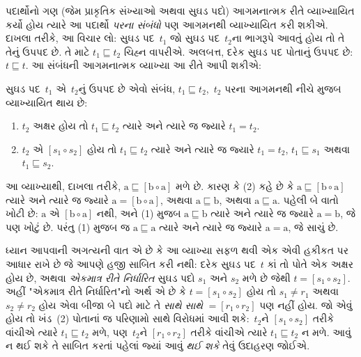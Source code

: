 \documentclass[../../../include/open-logic-section]{subfiles}
\begin{document}


પદાર્થોનો ગણ (જેમ પ્રાકૃતિક સંખ્યાઓ અથવા સુઘડ પદો)
આગમનાત્મક રીતે વ્યાખ્યાયિત કર્યો હોય ત્યારે આ પદાર્થો
\emph{પરના સંબંધો} પણ આગમનથી વ્યાખ્યાયિત કરી શકીએ.
દાખલા તરીકે, આ વિચાર લો: સુઘડ પદ~$t_1$ જો સુઘડ
પદ~$t_2$ના ભાગરૂપે આવતું હોય તો તે તેનું ઉપપદ છે.
તે માટે $t_1 \sqsubseteq t_2$ ચિહ્ન વાપરીએ.
અલબત્ત, દરેક સુઘડ પદ પોતાનું ઉપપદ છે:
$t \sqsubseteq t$. આ સંબંધની આગમનાત્મક વ્યાખ્યા
આ રીતે આપી શકીએ:

\begin{defn}
  સુઘડ પદ~$t_1$ એ~$t_2$નું ઉપપદ છે એવો સંબંધ,
  $t_1 \sqsubseteq t_2$,~$t_2$ પરના આગમનથી
  નીચે મુજબ વ્યાખ્યાયિત થાય છે:
  \begin{enumerate}
  \item $t_2$ અક્ષર હોય તો $t_1 \sqsubseteq t_2$
    ત્યારે અને ત્યારે જ જ્યારે $t_1 = t_2$.
  \item $t_2$ એ $[s_1 \circ s_2]$ હોય તો
    $t_1 \sqsubseteq t_2$ ત્યારે અને ત્યારે જ જ્યારે
    $t_1 = t_2$, $t_1 \sqsubseteq s_1$ અથવા
    $t_1 \sqsubseteq s_2$.
  \end{enumerate}
\end{defn}

આ વ્યાખ્યાથી, દાખલા તરીકે, $\mathrm{a}
\sqsubseteq [\mathrm{b} \circ \mathrm{a}]$
મળે છે. કારણ કે (2) કહે છે કે
$\mathrm{a} \sqsubseteq [\mathrm{b} \circ \mathrm{a}]$
ત્યારે અને ત્યારે જ જ્યારે
$\mathrm{a} = [\mathrm{b} \circ \mathrm{a}]$,
અથવા $\mathrm{a} \sqsubseteq \mathrm{b}$,
અથવા $\mathrm{a} \sqsubseteq \mathrm{a}$.
પહેલી બે વાતો ખોટી છે: $\mathrm{a}$ એ
$[\mathrm{b} \circ
  \mathrm{a}]$ નથી, અને (1) મુજબ
$\mathrm{a} \sqsubseteq \mathrm{b}$
ત્યારે અને ત્યારે જ જ્યારે $\mathrm{a} = \mathrm{b}$,
જે પણ ખોટું છે. પરંતુ (1) મુજબ જ
$\mathrm{a} \sqsubseteq \mathrm{a}$
ત્યારે અને ત્યારે જ જ્યારે $\mathrm{a} = \mathrm{a}$,
જે સાચું છે.

ધ્યાન આપવાની અગત્યની વાત એ છે કે આ વ્યાખ્યા
સફળ થવી એક એવી હકીકત પર આધાર રાખે છે જે
આપણે હજી સાબિત કરી નથી: દરેક સુઘડ પદ~$t$
કાં તો પોતે એક અક્ષર હોય છે, અથવા
\emph{એકમાત્ર રીતે નિર્ધારિત} સુઘડ પદો
$s_1$ અને $s_2$ મળે છે જેથી
$t = [s_1 \circ s_2]$. અહીં "એકમાત્ર રીતે
નિર્ધારિત"નો અર્થ એ છે કે
$t = [s_1 \circ s_2]$ હોય તો
$s_1 \neq r_1$ અથવા $s_2 \neq r_2$ હોય
એવા બીજા બે પદો માટે તે \emph{સાથે સાથે}
$= [r_1 \circ r_2]$ પણ નહીં હોય. જો એવું
હોય તો ખંડ~(2) પોતાનાં જ પરિણામો સાથે
વિરોધમાં આવી શકે:~$t_2$ને
$[s_1 \circ s_2]$ તરીકે વાંચીએ ત્યારે
$t_1 \sqsubseteq t_2$ મળે, પણ~$t_2$ને
$[r_1 \circ r_2]$ તરીકે વાંચીએ ત્યારે
$t_1 \sqsubseteq t_2$ ન મળે. આવું ન
થઈ શકે તે સાબિત કરતાં પહેલાં જ્યાં
આવું \emph{થઈ શકે} તેવું ઉદાહરણ જોઈએ.
\end{document}

